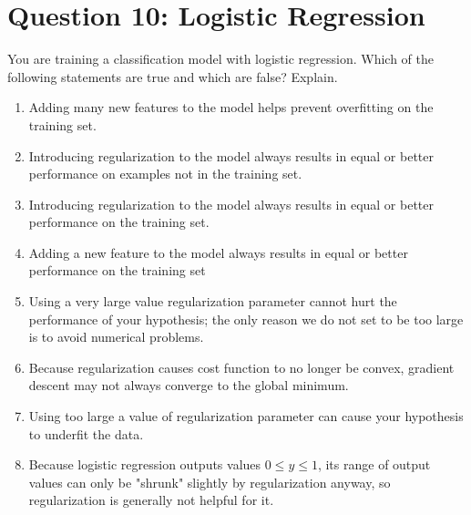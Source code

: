 \documentclass[12pt]{article}
\begin{document}
	\section*{Question 10: Logistic Regression}
	You are training a classification model with logistic regression. Which of the following statements are true and which are false? Explain.
	\begin{enumerate}
		\item Adding many new features to the model helps prevent overfitting on the training set.
		\item Introducing regularization to the model always results in equal or better performance on examples not in the training set.
		\item Introducing regularization to the model always results in equal or better performance on the training set.
		\item Adding a new feature to the model always results in equal or better performance on the training set
		\item Using a very large value regularization parameter cannot hurt the performance of your hypothesis; the only reason we do not set to be too large is to avoid numerical problems.
		\item Because regularization causes cost function to no longer be convex, gradient descent may not always converge to the global minimum.
		\item Using too large a value of regularization parameter can cause your hypothesis to underfit the data.
		\item Because logistic regression outputs values $0 \leq y \leq 1$, its range of output values can only be "shrunk" slightly by regularization anyway, so regularization is generally not helpful for it.
	\end{enumerate}
	
\end{document}
